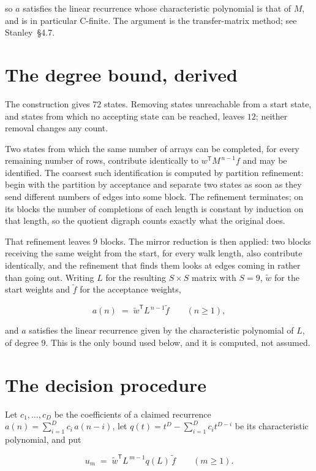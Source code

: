 \documentclass[11pt]{article}
\theoremstyle{definition}
\begin{document}
so $a$ satisfies the linear recurrence whose characteristic polynomial is that of $M$, and is in particular C-finite. The argument is the transfer-matrix method; see Stanley~\S4.7.

\section{The degree bound, derived}

The construction gives $72$ states. Removing states unreachable from a start state, and states from which no accepting state can be reached, leaves $12$; neither removal changes any count.

Two states from which the same number of arrays can be completed, for every remaining number of rows, contribute identically to $w^{\mathsf T}M^{\,n-1}f$ and may be identified. The coarsest such identification is computed by partition refinement: begin with the partition by acceptance and separate two states as soon as they send different numbers of edges into some block. The refinement terminates; on its blocks the number of completions of each length is constant by induction on that length, so the quotient digraph counts exactly what the original does.

That refinement leaves $9$ blocks. The mirror reduction is then applied: two blocks receiving the same weight from the start, for every walk length, also contribute identically, and the refinement that finds them looks at edges coming in rather than going out. Writing $L$ for the resulting $S \times S$ matrix with $S = 9$, $\tilde w$ for the start weights and $\tilde f$ for the acceptance weights,

\[a(n) \;=\; \tilde w^{\mathsf T} L^{\,n-1} \tilde f \qquad (n \ge 1),\]

and $a$ satisfies the linear recurrence given by the characteristic polynomial of $L$, of degree $9$. This is the only bound used below, and it is computed, not assumed.

\section{The decision procedure}

Let $c_1,\dots,c_D$ be the coefficients of a claimed recurrence $a(n) = \sum_{i=1}^{D} c_i\,a(n-i)$, let $q(t) = t^{D} - \sum_{i=1}^{D} c_i t^{D-i}$ be its characteristic polynomial, and put

\[u_m \;=\; \tilde w^{\mathsf T} L^{\,m-1} q(L)\,\tilde f \qquad (m \ge 1).\]
\end{document}
